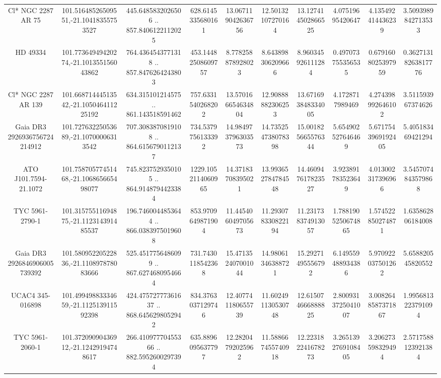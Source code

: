 \begin{table}
\begin{tabular}{cccccccccc}
Cl* NGC 2287     AR      75 & 101.51648526509551,-21.10418355753527 & 445.6485832026506 .. 857.8406122112025 & 628.6145335680161 & 13.067119042636756 & 12.50132107270164 & 13.127414502866525 & 4.07519695420647 & 4.135492414436239 & 3.5093989842713533 \\
HD  49334 & 101.77364949420274,-21.101355156043862 & 764.4364543771318 .. 857.8476264243803 & 453.14482508609757 & 8.778258878928023 & 8.643898306209666 & 8.960345926111284 & 0.497073755356535 & 0.6791608025397959 & 0.36271318263817776 \\
Cl* NGC 2287     AR     139 & 101.66871444513542,-21.105046411225192 & 634.315101214575 .. 861.143518591462 & 757.6331540268202 & 13.570166654634804 & 12.90888882306253 & 13.671693848334005 & 4.1728717989469 & 4.274398992646102 & 3.511593967374626 \\
Gaia DR3 2926936756724214912 & 101.72763225053689,-21.10700006313542 & 707.3083870819108 .. 864.6156790112137 & 734.5379756133392 & 14.984973796303573 & 14.735254738078398 & 15.001825665576344 & 5.654902527646469 & 5.6717543969192405 & 5.405183469421294 \\
ATO J101.7594-21.1072 & 101.75870577451468,-21.106865665498077 & 745.8237529350105 .. 864.9148794423384 & 1229.1052114060965 & 14.37183708395021 & 13.993652784784548 & 14.460947617823527 & 3.923891783523649 & 4.013002317396966 & 3.5457074843579868 \\
TYC 5961-2790-1 & 101.31575511694875,-21.112314391485537 & 196.7460044853644 .. 866.0383975019608 & 853.9709649871904 & 11.445406049705673 & 11.293078330822194 & 11.231738374913057 & 1.7881905250674865 & 1.574522850274871 & 1.635862806184008 \\
Gaia DR3 2926846906005739392 & 101.58095220522836,-21.110897878083666 & 525.4517756486099 .. 867.6274680954664 & 731.7430118542368 & 15.471352407001044 & 14.98061346388721 & 15.29271495556792 & 6.149559488934386 & 5.970922037501262 & 5.658820545820552 \\
UCAC4 345-016898 & 101.49949883334659,-21.112513911592398 & 424.47572777361637 .. 868.6456298052942 & 834.3763037129746 & 12.407741180655739 & 11.602491130530748 & 12.615074666888825 & 2.8009313725041007 & 3.0082648587371867 & 1.9956813223791094 \\
TYC 5961-2060-1 & 101.37209090436912,-21.12429194748617 & 266.41097770455366 .. 882.5952600297394 & 635.8896095637797 & 12.28204792025962 & 11.588667455740918 & 12.223182241678273 & 3.2651392769108405 & 3.206273598329494 & 2.5717588123921384 \\

\end{tabular}
\end{table}

